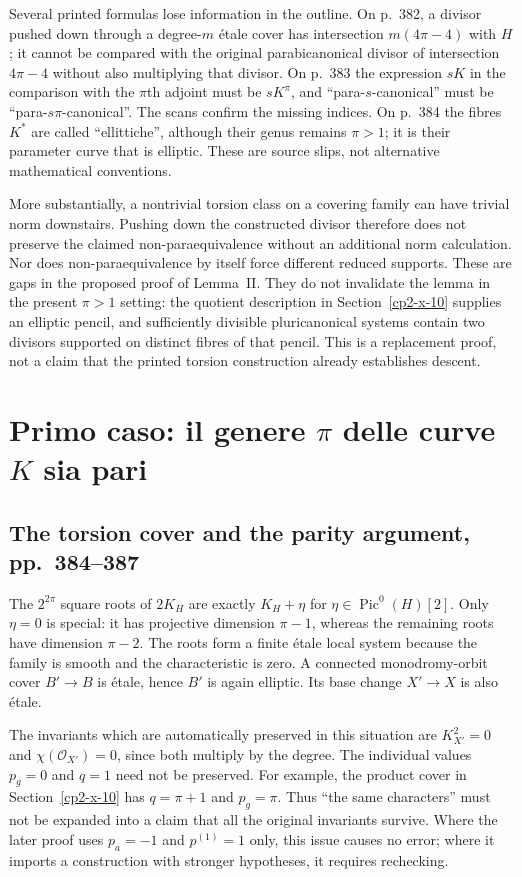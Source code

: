 Several printed formulas lose information in the outline. On p.~382, a divisor pushed down through a degree-$m$ étale cover has intersection $m(4\pi-4)$ with $H$; it cannot be compared with the original parabicanonical divisor of intersection $4\pi-4$ without also multiplying that divisor. On p.~383 the expression $sK$ in the comparison with the $\pi$th adjoint must be $sK^\pi$, and ``para-$s$-canonical'' must be ``para-$s\pi$-canonical''. The scans confirm the missing indices. On p.~384 the fibres $K^*$ are called ``ellittiche'', although their genus remains $\pi>1$; it is their parameter curve that is elliptic. These are source slips, not alternative mathematical conventions.

More substantially, a nontrivial torsion class on a covering family can have trivial norm downstairs. Pushing down the constructed divisor therefore does not preserve the claimed non-paraequivalence without an additional norm calculation. Nor does non-paraequivalence by itself force different reduced supports. These are gaps in the proposed proof of Lemma~II. They do not invalidate the lemma in the present $\pi>1$ setting: the quotient description in Section~\ref{cp2-x-10} supplies an elliptic pencil, and sufficiently divisible pluricanonical systems contain two divisors supported on distinct fibres of that pencil. This is a replacement proof, not a claim that the printed torsion construction already establishes descent.

\section{Primo caso: il genere \texorpdfstring{$\pi$}{π} delle curve \texorpdfstring{$K$}{K} sia pari}
\label{cp2-x-7}

\subsection{The torsion cover and the parity argument, pp.~384--387}

The $2^{2\pi}$ square roots of $2K_H$ are exactly $K_H+\eta$ for $\eta\in\operatorname{Pic}^0(H)[2]$. Only $\eta=0$ is special: it has projective dimension $\pi-1$, whereas the remaining roots have dimension $\pi-2$. The roots form a finite étale local system because the family is smooth and the characteristic is zero. A connected monodromy-orbit cover $B'\to B$ is étale, hence $B'$ is again elliptic. Its base change $X'\to X$ is also étale.

The invariants which are automatically preserved in this situation are $K_{X'}^2=0$ and $\chi(\mathcal O_{X'})=0$, since both multiply by the degree. The individual values $p_g=0$ and $q=1$ need not be preserved. For example, the product cover in Section~\ref{cp2-x-10} has $q=\pi+1$ and $p_g=\pi$. Thus ``the same characters'' must not be expanded into a claim that all the original invariants survive. Where the later proof uses $p_a=-1$ and $p^{(1)}=1$ only, this issue causes no error; where it imports a construction with stronger hypotheses, it requires rechecking.

